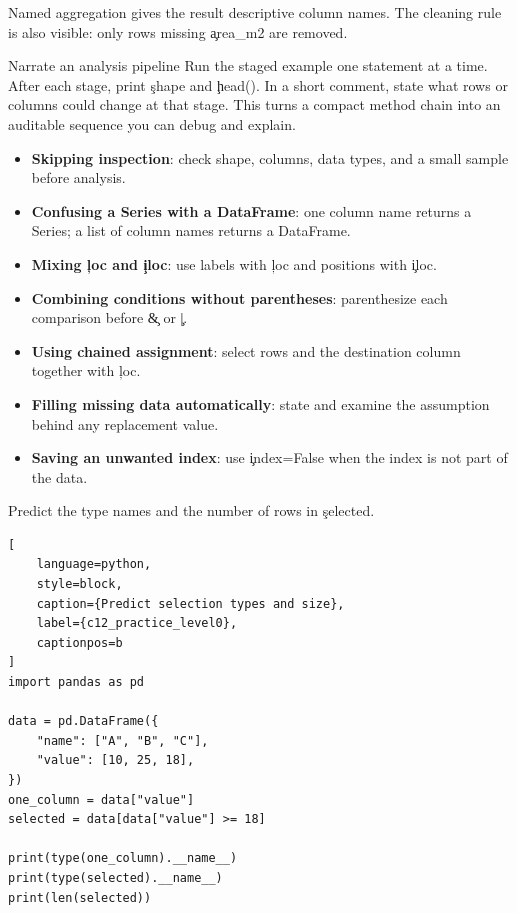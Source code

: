 Named aggregation gives the result descriptive column names. The cleaning rule
is also visible: only rows missing \c{area_m2} are removed.

\begin{TryBox}{Narrate an analysis pipeline}
Run the staged example one statement at a time. After each stage, print
\c{shape} and \c{head()}. In a short comment, state what rows or columns could
change at that stage. This turns a compact method chain into an auditable
sequence you can debug and explain.
\end{TryBox}


\begin{itemize}
    \item \textbf{Skipping inspection}: check shape, columns, data types, and a
    small sample before analysis.
    \item \textbf{Confusing a Series with a DataFrame}: one column name returns
    a Series; a list of column names returns a DataFrame.
    \item \textbf{Mixing \c{loc} and \c{iloc}}: use labels with \c{loc} and
    positions with \c{iloc}.
    \item \textbf{Combining conditions without parentheses}: parenthesize each
    comparison before \c{&} or \c{|}.
    \item \textbf{Using chained assignment}: select rows and the destination
    column together with \c{loc}.
    \item \textbf{Filling missing data automatically}: state and examine the
    assumption behind any replacement value.
    \item \textbf{Saving an unwanted index}: use \c{index=False} when the index
    is not part of the data.
\end{itemize}



Predict the type names and the number of rows in \c{selected}.

\begin{lstlisting}[
    language=python,
    style=block,
    caption={Predict selection types and size},
    label={c12_practice_level0},
    captionpos=b
]
import pandas as pd

data = pd.DataFrame({
    "name": ["A", "B", "C"],
    "value": [10, 25, 18],
})
one_column = data["value"]
selected = data[data["value"] >= 18]

print(type(one_column).__name__)
print(type(selected).__name__)
print(len(selected))
\end{lstlisting}

